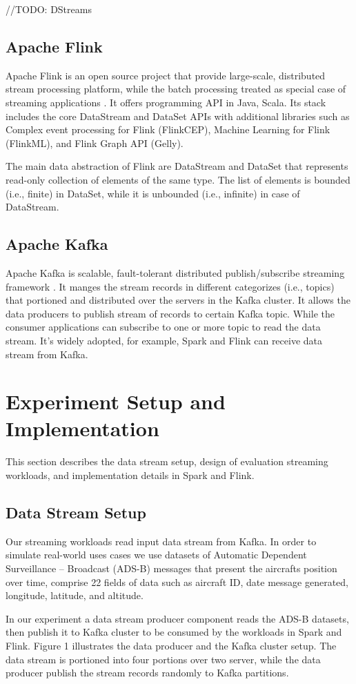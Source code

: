 \documentclass[]{article}
\begin{document}
//TODO: DStreams

\subsection{Apache Flink}

Apache Flink is an open source project that provide large-scale, distributed stream processing platform, while the batch processing treated as special case of streaming applications \cite{flink}.
It offers programming API in Java, Scala. Its stack includes the core DataStream and DataSet APIs with additional libraries such as Complex event processing for Flink (FlinkCEP), Machine Learning for Flink (FlinkML), and Flink Graph API (Gelly).

The main data abstraction of Flink are DataStream and DataSet that represents read-only collection of elements of the same type. The list of elements is bounded (i.e., finite) in DataSet, while it is unbounded (i.e., infinite) in case of DataStream.


\subsection{Apache Kafka}
Apache Kafka is scalable, fault-tolerant distributed publish/subscribe streaming framework \cite{kafka}.
It manges the stream records in different categorizes (i.e., topics) that portioned and distributed over the servers in the Kafka cluster. It allows the data producers to publish stream of records to certain Kafka topic. While the consumer applications can subscribe to one or more topic to read the data stream. It's widely  adopted, for example, 
Spark and Flink can receive data stream from Kafka. 


\section{Experiment Setup and Implementation}
This section describes the data stream setup, design of evaluation streaming workloads, and implementation details in Spark and Flink.

\subsection{Data Stream Setup}
Our streaming workloads read input data stream from Kafka. In order to simulate real-world uses cases we use datasets of Automatic Dependent Surveillance – Broadcast (ADS-B) messages that present the aircrafts position over time, comprise 22 fields of data such as aircraft ID, date message generated, longitude, latitude, and altitude.
\par In our experiment a data stream producer component reads the ADS-B datasets, then publish it to Kafka cluster to be consumed by the workloads in Spark and Flink. Figure 1 illustrates the data producer and the Kafka cluster setup.
The data stream is portioned into four portions over two server, while the data producer publish the stream records randomly to Kafka partitions.
\end{document}
